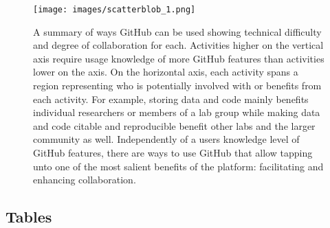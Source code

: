 \begin{figure}
\hypertarget{fig:scatterblob}{%
\centering
\texttt{[image: images/scatterblob\_1.png]}
\caption{A summary of ways GitHub can be used showing technical difficulty and degree of collaboration for each. Activities higher on the vertical axis require usage knowledge of more GitHub features than activities lower on the axis. On the horizontal axis, each activity spans a region representing who is potentially involved with or benefits from each activity. For example, storing data and code mainly benefits individual researchers or members of a lab group while making data and code citable and reproducible benefit other labs and the larger community as well. Independently of a users knowledge level of GitHub features, there are ways to use GitHub that allow tapping unto one of the most salient benefits of the platform: facilitating and enhancing collaboration.}\label{fig:scatterblob}
}
\end{figure}

\hypertarget{tables}{%
\subsection{Tables}\label{tables}}

